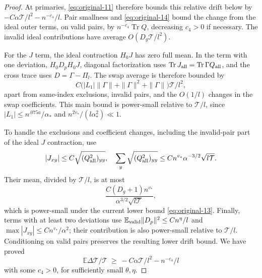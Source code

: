 \begin{proof}
At primaries, \eqref{eq:original-11} therefore bounds this relative drift
below by \(-C\alpha\mathcal T/l^2 -n^{-c_4}/l\). Pair smallness and
\eqref{eq:original-14} bound the change from the ideal outer terms, on
valid pairs, by \(n^{-c_4}\operatorname{Tr}Q\), decreasing
\(c_4>0\) if necessary. The invalid ideal contributions have average
\(O(D_g\mathcal T/l^2)\).

For the \(J\) term, the ideal contraction \(H_0J\) has zero full
mean. In the term with one deviation, \(H_0D_pH_0J\), diagonal
factorization uses
\(\operatorname{Tr}J_{\rm all}=\operatorname{Tr}\Gamma Q_{\rm all}\),
and the cross trace uses \(D=\Gamma-\Pi_l\). The swap average is
therefore bounded by
\[
 C\bigl(|L_1|\|\Gamma\|+\|\Gamma\|^2+\|\Gamma\|\bigr)
       \mathcal T/l^2,
\]
apart from same-index exclusions, invalid pairs, and the
\(O(1/l)\) changes in the swap coefficients. This main bound is
power-small relative to \(\mathcal T/l\), since
\(\lvert L_1\rvert\le n^{.075a}/\alpha_*\) and
\(n^{2v_*}/(l\alpha_*^2)\ll1\).

To handle the exclusions and coefficient changes, including the
invalid-pair part of the ideal \(J\) contraction, use
\[
 |J_{xy}|\le C\sqrt{(Q_{\rm all}^2)_{yy}},\quad
 \sum_y\sqrt{(Q_{\rm all}^2)_{yy}}\le C n^{v_*}\alpha^{-3/2}\sqrt{l\mathcal T}.
\]
Their mean, divided by \(\mathcal T/l\), is at most
\[
 \frac{C(D_g+1)n^{v_*}}{\alpha^{3/2}\sqrt{l\mathcal T}},
\]
which is power-small under the current lower bound
\eqref{eq:original-13}. Finally, terms with at least two deviations
use \(\mathbb E_{\rm valid}\|D_p\|^2\le Cn^\eta/l\) and
\(\max|J_{xy}|\le Cn^{v_*}/\alpha^2\); their contribution is
also power-small relative to \(\mathcal T/l\). Conditioning on
valid pairs preserves the resulting lower drift bound. We have proved
\begin{equation}
 \mathbb E\Delta\mathcal T/\mathcal T \ \ge\ -C\alpha\mathcal T/l^2-n^{-c_4}/l
\label{eq:original-20}
\end{equation}
with some \(c_4>0\), for sufficiently small \(\theta,\eta\).


\end{proof}
